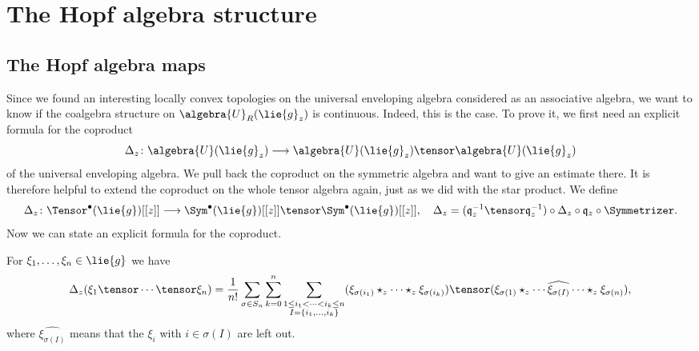 
%
%

\chapter{The Hopf algebra structure}

\section{The Hopf algebra maps}
\label{sec:chap7_Coproduct}

\label{sec:Hopf}

Since we found an interesting locally convex topologies on the universal
enveloping algebra considered as an associative algebra, we want to know if the 
coalgebra structure on $\algebra{U}_R(\lie{g}_z)$ is continuous. 
Indeed, this is the case. To prove it, we first need an explicit formula for 
the coproduct
\begin{equation}
    \label{eq:CoProduct}
    \coproduct_z \colon
    \algebra{U}(\lie{g}_z)
    \longrightarrow
    \algebra{U}(\lie{g}_z)
    \tensor
    \algebra{U}(\lie{g}_z)
\end{equation}
of the universal enveloping algebra.  We pull back the coproduct
on the symmetric algebra and want to give an estimate there. It is
therefore helpful to extend the coproduct on the whole tensor algebra
again, just as we did with the star product. We define
\begin{equation}
    \label{eq:CoProductOnTensor}
    \ocoproduct_z \colon
    \Tensor^\bullet(\lie{g})[[z]]
    \longrightarrow
    \Sym^\bullet(\lie{g})[[z]]
    \tensor
    \Sym^\bullet(\lie{g})[[z]]
    , \quad
    \ocoproduct_z
    =
    (\mathfrak{q}_z^{-1} \tensor \mathfrak{q}_z^{-1})
    \circ
    \coproduct_z
    \circ
    \mathfrak{q}_z
    \circ
    \Symmetrizer.
\end{equation}
Now we can state an explicit formula for the coproduct.
\begin{lemma}
    \label{Thm:Hopf:CoproductFormula}%
    For $\xi_1, \ldots, \xi_n \in \lie{g}$ we have
    \begin{equation}
        \label{Hopf:CoproductFormula}
        \ocoproduct_z(\xi_1 \tensor \cdots \tensor \xi_n)
        =
        \frac{1}{n!}
        \sum\limits_{\sigma \in S_n}
        \sum\limits_{k=0}^n
        \sum\limits_{\substack{
            1 \leq i_1 < \cdots < i_k \leq n \\
            I = \{i_1, \ldots, i_k\} }}
        ( \xi_{\sigma(i_1)}
        \star_z \cdots \star_z
        \xi_{\sigma(i_k)} )
        \tensor
        ( \xi_{\sigma(1)} \star_z
        \cdots \widehat{\xi_{\sigma(I)}} \cdots
        \star_z \xi_{\sigma(n)} ),
    \end{equation}
    where $\widehat{\xi_{\sigma(I)}}$ means that the $\xi_i$ with $i
    \in \sigma(I)$ are left out.
\end{lemma}
